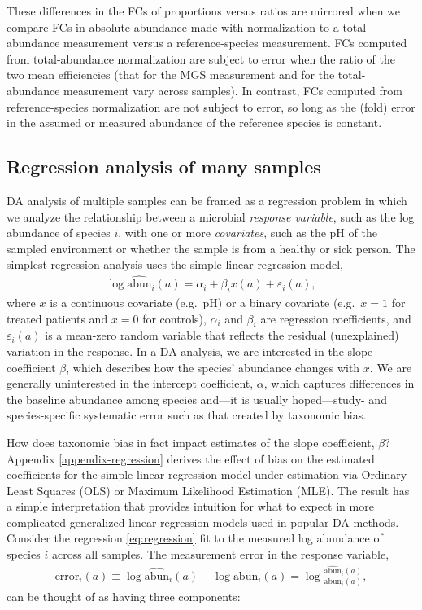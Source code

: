 \documentclass[
]{article}
\begin{document}
These differences in the FCs of proportions versus ratios are mirrored when we compare FCs in absolute abundance made with normalization to a total-abundance measurement versus a reference-species measurement.
FCs computed from total-abundance normalization are subject to error when the ratio of the two mean efficiencies (that for the MGS measurement and for the total-abundance measurement vary across samples).
In contrast, FCs computed from reference-species normalization are not subject to error, so long as the (fold) error in the assumed or measured abundance of the reference species is constant.

\hypertarget{regression-analysis-of-many-samples}{%
\subsection{Regression analysis of many samples}\label{regression-analysis-of-many-samples}}

DA analysis of multiple samples can be framed as a regression problem in which we analyze the relationship between a microbial \emph{response variable}, such as the log abundance of species \(i\), with one or more \emph{covariates}, such as the pH of the sampled environment or whether the sample is from a healthy or sick person.
The simplest regression analysis uses the simple linear regression model,
\begin{align}
  \label{eq:regression}
  \log \widehat{\text{abun}}_i(a) = \alpha_i + \beta_i x(a) + \varepsilon_i(a),
\end{align}
where \(x\) is a continuous covariate (e.g.~pH) or a binary covariate (e.g.~\(x=1\) for treated patients and \(x=0\) for controls), \(\alpha_i\) and \(\beta_i\) are regression coefficients, and \(\varepsilon_i(a)\) is a mean-zero random variable that reflects the residual (unexplained) variation in the response.
In a DA analysis, we are interested in the slope coefficient \(\beta\), which describes how the species' abundance changes with \(x\).
We are generally uninterested in the intercept coefficient, \(\alpha\), which captures differences in the baseline abundance among species and---it is usually hoped---study- and species-specific systematic error such as that created by taxonomic bias.

How does taxonomic bias in fact impact estimates of the slope coefficient, \(\beta\)?
Appendix \ref{appendix-regression} derives the effect of bias on the estimated coefficients for the simple linear regression model under estimation via Ordinary Least Squares (OLS) or Maximum Likelihood Estimation (MLE).
The result has a simple interpretation that provides intuition for what to expect in more complicated generalized linear regression models used in popular DA methods.
Consider the regression \eqref{eq:regression} fit to the measured log abundance of species \(i\) across all samples.
The measurement error in the response variable,
\begin{align}
  \text{error}_{i}(a) \equiv 
  \log \widehat{\text{abun}}_i(a) - \log \text{abun}_i(a)
  = \log \frac{\widehat{\text{abun}}_i(a)}{\text{abun}_i(a)},
\end{align}
can be thought of as having three components:
\end{document}
